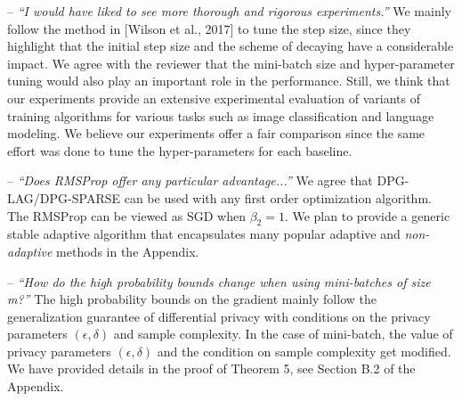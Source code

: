 \documentclass{article}
\begin{document}
-- \textit{ 
``I would have liked to see more thorough and rigorous experiments.'' 
}
We mainly  follow the method in [Wilson et al., 2017] to tune the step size, since they highlight that the initial step size and the scheme of decaying have a considerable impact. 
We agree with the reviewer that the mini-batch size and hyper-parameter tuning would also play an important role in the performance.
Still, we think that our experiments provide an extensive experimental evaluation of variants of training algorithms for various tasks such as image classification and language modeling. 
We believe our experiments offer a fair comparison since the same effort was done to tune the hyper-parameters for each baseline. \vspace{-4pt}

    
-- \textit{``Does RMSProp offer any particular advantage...''}
We agree that DPG-LAG/DPG-SPARSE can be used with any first order optimization algorithm. 
The RMSProp can be viewed as SGD when $\beta_2 = 1$. 
We plan to provide a generic stable adaptive algorithm that encapsulates many popular adaptive and \emph{non-adaptive} methods in the Appendix. \vspace{-4pt}
    
    
-- \textit{``How do the high probability bounds change when using mini-batches of size m?''} 
The high probability bounds on the gradient mainly follow the generalization guarantee of differential privacy with conditions on the privacy parameters $(\epsilon, \delta)$ and sample complexity. 
In the case of mini-batch, the value of privacy parameters $(\epsilon, \delta)$ and the condition on sample complexity get modified. We have provided details in the proof of Theorem 5, see Section B.2 of the Appendix.

\vspace{-4pt}
    
\end{document}
